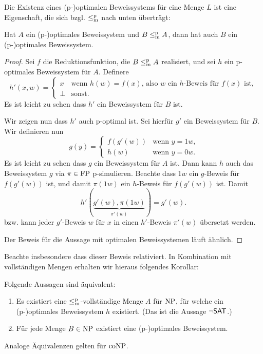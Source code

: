 Die Existenz eines (p-)optimalen Beweissystems für eine Menge $L$ ist eine Eigenschaft, die sich bzgl. $\leq_\mathrm{m}^\mathrm{p}$ nach unten überträgt:
\begin{lemma}\label{lemma:optimal-downward}
    Hat $A$ ein (p-)optimales Beweissystem und $B\leq_\mathrm{m}^\mathrm{p} A$, dann hat auch $B$ ein (p-)optimales Beweissystem.
\end{lemma}
\begin{proof}
    Sei $f$ die Reduktionsfunktion, die $B\leq_\mathrm{m}^\mathrm{p} A$ realisiert, und 
    sei $h$ ein p-optimales Beweissystem für $A$. Definere
    \[ h'(x,w) = \begin{cases} x & \text{wenn $h(w)=f(x)$, also $w$ ein $h$-Beweis für $f(x)$ ist},\\ \bot & \text{sonst.} \end{cases} \]
    Es ist leicht zu sehen dass $h'$ ein Beweissystem für $B$ ist.

    Wir zeigen nun dass $h'$ auch p-optimal ist. Sei hierfür $g'$ ein Beweissystem für $B$. Wir definieren nun
    \[ g(y) = \begin{cases} f(g'(w)) & \text{wenn $y=1w$,}\\ h(w) & \text{wenn $y=0w$.} \end{cases}\]
    Es ist leicht zu sehen dass $g$ ein Beweissystem für $A$ ist. Dann kann $h$ auch das Beweissystem $g$ via $\pi\in\mathrm{FP}$ p-simulieren.
    Beachte dass $1w$ ein $g$-Beweis für $f(g'(w))$ ist, und damit $\pi(1w)$ ein $h$-Beweis für $f(g'(w))$ ist.
    Damit
    \[ h'(\underbrace{g'(w), \pi(1w)}_{\pi'(w)}) = g'(w). \]
    bzw. kann jeder $g'$-Beweis $w$ für $x$ in einen $h'$-Beweis $\pi'(w)$ übersetzt werden.

    Der Beweis für die Aussage mit optimalen Beweissystemen läuft ähnlich.
\end{proof}
Beachte insbesondere dass dieser Beweis relativiert.
In Kombination mit vollständigen Mengen erhalten wir hieraus folgendes Korollar:
\begin{corollary}
    Folgende Aussagen sind äquivalent:
    \begin{enumerate}
        \item Es existiert eine $\leq_\mathrm{m}^\mathrm{p}$-vollständige Menge $A$ für $\mathrm{NP}$, für welche ein (p-)optimales Beweissystem $h$ existiert. (Das ist die Aussage $\neg\mathsf{SAT}$.)
        \item Für jede Menge $B\in\mathrm{NP}$ existiert eine (p-)optimales Beweissystem.
    \end{enumerate}
    Analoge Äquivalenzen gelten für $\mathrm{coNP}$.
\end{corollary}
